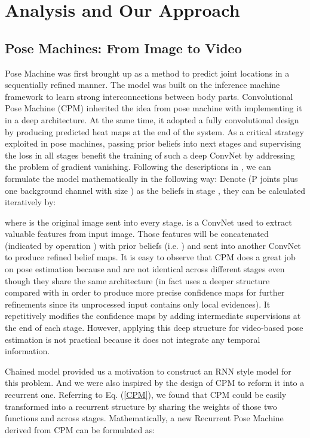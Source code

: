 \documentclass[10pt,twocolumn,letterpaper]{article}
\begin{document}
\section{Analysis and Our Approach}

\subsection{Pose Machines: From Image to Video}

Pose Machine \cite{rama14refinePM} was first brought up as a method to predict joint locations in a sequentially refined manner. The model was built on the inference machine framework to learn strong interconnections between body parts. Convolutional Pose Machine (CPM) \cite{wei16refineCPM} inherited the idea from pose machine with implementing it in a deep architecture. At the same time, it adopted a fully convolutional design by producing predicted heat maps at the end of the system. As a critical strategy exploited in pose machines, passing prior beliefs into next stages and supervising the loss in all stages benefit the training of such a deep ConvNet by addressing the problem of gradient vanishing. Following the descriptions in \cite{wei16refineCPM}, we can formulate the model mathematically in the following way: Denote  (P joints plus one background channel with size ) as the beliefs in stage , they can be calculated iteratively by: 

where  is the original image sent into every stage.
 is a ConvNet used to extract valuable features from input image. Those features will be concatenated (indicated by operation ) with prior beliefs (i.e. ) and sent into another ConvNet  to produce refined belief maps. It is easy to observe that CPM does a great job on pose estimation because   and  are not identical across different stages  even though they share the same architecture (in fact  uses a deeper structure compared with  in order to produce more precise confidence maps for further refinements since its unprocessed input contains only local evidences). It repetitively modifies the confidence maps by adding intermediate supervisions at the end of each stage. However, applying this deep structure for video-based pose estimation is not practical because it does not integrate any temporal information.

Chained model \cite{geor16chain} provided us a motivation to construct an RNN style model for this problem. And we were also inspired by the design of CPM to reform it into a recurrent one. Referring to Eq. (\ref{CPM}), we found that CPM could be easily transformed into a recurrent structure by sharing the weights of those two functions  and  across stages. Mathematically, a new Recurrent Pose Machine derived from CPM can be formulated as:
\end{document}
